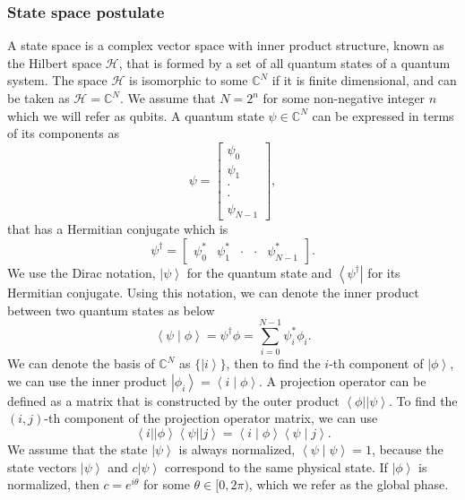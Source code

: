 \documentclass[11pt]{article}
\newcommand{\braket}[2]{\left \langle #1 \middle| #2 \right \rangle}
\newcommand{\bra}[1]{\left\langle #1\right|}
\newcommand{\ket}[1]{\left|#1\right\rangle}
\begin{document}
\subsubsection{State space postulate}
A state space is a complex vector space with inner product structure, known as the Hilbert space $\mathcal{H}$, that is formed by a set of all quantum states of a quantum system.
The space $\mathcal{H}$ is isomorphic to some $\mathbb{C}^N$ if it is finite dimensional, and can be taken as $\mathcal{H} = \mathbb{C}^N$. We assume that $N = 2^n$ for some non-negative
integer $n$ which we will refer as qubits. A quantum state $\psi \in \mathbb{C}^N$ can be expressed in terms of its components as
\begin{equation}
    \psi = \begin{bmatrix}
        \psi_0 \\
        \psi_1 \\
        \cdot \\
        \cdot \\
        \psi_{N-1}
    \end{bmatrix},
\end{equation}
that has a Hermitian conjugate which is
\begin{equation}
    \psi^\dagger = \begin{bmatrix}
        \psi_0^* & \psi_1^* & \cdot & \cdot & \psi_{N-1}^*
    \end{bmatrix}.
\end{equation}
We use the Dirac notation, $\ket{\psi}$ for the quantum state and $\bra{\psi^\dagger}$ for its Hermitian conjugate. Using this notation, we can denote the inner product between two quantum states as below
\begin{equation}
    \braket{\psi}{\phi} = \psi^\dagger\phi = \sum_{i=0}^{N-1}\psi_i^*\phi_i.
\end{equation} 
We can denote the basis of $\mathbb{C}^N$ as $\{\ket{i}\}$, then to find the $i$-th component of $\ket{\phi}$, we can use the inner product $\ket{\phi_i} = \braket{i}{\phi}$. A projection operator can be defined as a matrix 
that is constructed by the outer product $\bra{\phi}\ket{\psi}$. To find the $(i,j)$-th component of the projection operator matrix, we can use 
\begin{equation}
    \bra{i}\ket{\phi}\bra{\psi}\ket{j} = \braket{i}{\phi}\braket{\psi}{j}.
\end{equation}
We assume that the state $\ket{\psi}$ is always normalized, $\braket{\psi}{\psi} = 1$, because the state vectors $\ket{\psi}$ and $c\ket{\psi}$ correspond to the same physical state. If $\ket{\phi}$ is normalized, then $c = e^{i\theta}$ for some $\theta \in [0,2\pi)$,
which we refer as the global phase.
\end{document}
